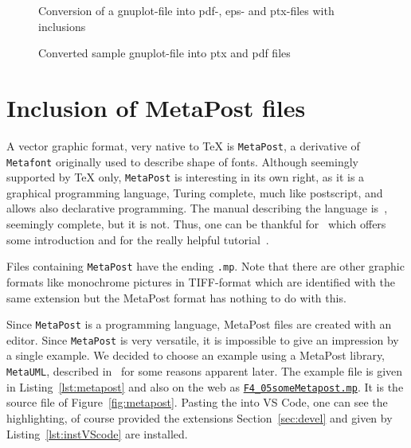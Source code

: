 \begin{figure}[htb]
\centering
{}
\caption{\label{fig:gp2pdf}Conversion of a gnuplot-file 
into pdf-, eps- and ptx-files with inclusions}
\end{figure}

\begin{figure}[htb]
\centering
{}
\caption{\label{fig:gnuplot}
Converted sample gnuplot-file into ptx and pdf files }
\end{figure}


\section{Inclusion of MetaPost files}\label{sec:metapost}

A vector graphic format, very native to TeX is \texttt{MetaPost}, 
a derivative of \texttt{Metafont} originally used to describe shape of fonts. 
Although seemingly supported by \TeX{} only, 
\texttt{MetaPost} is interesting in its own right, 
as it is a graphical programming language, 
Turing complete, much like postscript, and allows also declarative programming. 
The manual describing the language is~\cite{MPost}, 
seemingly complete, but it is not. 
Thus, one can be thankful for~\cite{MPostGuid} 
which offers some introduction and for the really helpful tutorial~\cite{MPostTut}. 

Files containing \texttt{MetaPost} have the ending \texttt{.mp}. 
Note that there are other graphic formats 
like monochrome pictures in TIFF-format 
which are identified with the same extension 
but the MetaPost format has nothing to do with this. 

Since \texttt{MetaPost} is a programming language, 
MetaPost files are created with an editor. 
Since \texttt{MetaPost} is very versatile, 
it is impossible to give an impression by a single example. 
We decided to choose an example 
using a MetaPost library, \texttt{MetaUML}, 
described in~\cite{MetaUml} for some reasons apparent later. 
The example file is given in Listing~\ref{lst:metapost} 
and also on the web as 
\href{\urlSite fromTex/F4_05someMetapost.mp}{\texttt{F4\_05someMetapost.mp}}. 
It is the source file of Figure~\ref{fig:metapost}. 
Pasting the into VS Code, one can see the highlighting, 
of course provided the extensions Section~\ref{sec:devel} 
and given by Listing~\ref{lst:instVScode} are installed. 


